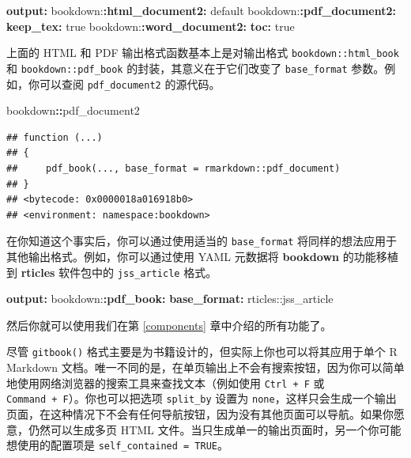 \documentclass[
  12pt,
]{krantz}
\newenvironment{Shaded}{\begin{snugshade}}{\end{snugshade}}
\newcommand{\AttributeTok}[1]{\textcolor[rgb]{0.13,0.29,0.53}{#1}}
\newcommand{\CharTok}[1]{\textcolor[rgb]{0.31,0.60,0.02}{#1}}
\newcommand{\FunctionTok}[1]{\textcolor[rgb]{0.13,0.29,0.53}{\textbf{#1}}}
\newcommand{\KeywordTok}[1]{\textcolor[rgb]{0.13,0.29,0.53}{\textbf{#1}}}
\newcommand{\NormalTok}[1]{#1}
\newcommand{\SpecialCharTok}[1]{\textcolor[rgb]{0.81,0.36,0.00}{\textbf{#1}}}
\theoremstyle{definition}
\theoremstyle{definition}
\theoremstyle{definition}
\theoremstyle{definition}
\theoremstyle{remark}
\begin{document}
\begin{Shaded}
\begin{Highlighting}[]
\FunctionTok{output}\KeywordTok{:}
\AttributeTok{  bookdown:}\FunctionTok{:html\_document2}\KeywordTok{:}\AttributeTok{ default}
\AttributeTok{  bookdown:}\FunctionTok{:pdf\_document2}\KeywordTok{:}
\AttributeTok{    }\FunctionTok{keep\_tex}\KeywordTok{:}\AttributeTok{ }\CharTok{true}
\AttributeTok{  bookdown:}\FunctionTok{:word\_document2}\KeywordTok{:}
\AttributeTok{    }\FunctionTok{toc}\KeywordTok{:}\AttributeTok{ }\CharTok{true}
\end{Highlighting}
\end{Shaded}

上面的 HTML 和 PDF 输出格式函数基本上是对输出格式 \texttt{bookdown::html\_book} 和 \texttt{bookdown::pdf\_book} 的封装，其意义在于它们改变了 \texttt{base\_format} 参数。例如，你可以查阅 \texttt{pdf\_document2} 的源代码。

\begin{Shaded}
\begin{Highlighting}[]
\NormalTok{bookdown}\SpecialCharTok{::}\NormalTok{pdf\_document2}
\end{Highlighting}
\end{Shaded}

\begin{verbatim}
## function (...) 
## {
##     pdf_book(..., base_format = rmarkdown::pdf_document)
## }
## <bytecode: 0x0000018a016918b0>
## <environment: namespace:bookdown>
\end{verbatim}

在你知道这个事实后，你可以通过使用适当的 \texttt{base\_format} 将同样的想法应用于其他输出格式。例如，你可以通过使用 YAML 元数据将 \textbf{bookdown} 的功能移植到 \textbf{rticles} 软件包\citep{R-rticles}中的 \texttt{jss\_article} 格式。

\begin{Shaded}
\begin{Highlighting}[]
\FunctionTok{output}\KeywordTok{:}
\AttributeTok{  bookdown:}\FunctionTok{:pdf\_book}\KeywordTok{:}
\AttributeTok{    }\FunctionTok{base\_format}\KeywordTok{:}\AttributeTok{ rticles::jss\_article}
\end{Highlighting}
\end{Shaded}

然后你就可以使用我们在第 \ref{components} 章中介绍的所有功能了。

尽管 \texttt{gitbook()} 格式主要是为书籍设计的，但实际上你也可以将其应用于单个 R Markdown 文档。唯一不同的是，在单页输出上不会有搜索按钮，因为你可以简单地使用网络浏览器的搜索工具来查找文本（例如使用 \texttt{Ctrl\ +\ F} 或 \texttt{Command\ +\ F}）。你也可以把选项 \texttt{split\_by} 设置为 \texttt{none}，这样只会生成一个输出页面，在这种情况下不会有任何导航按钮，因为没有其他页面可以导航。如果你愿意，仍然可以生成多页 HTML 文件。当只生成单一的输出页面时，另一个你可能想使用的配置项是 \texttt{self\_contained\ =\ TRUE}。
\end{document}
